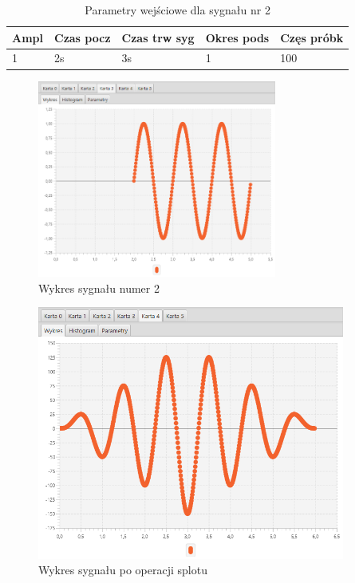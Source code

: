 \documentclass[12pt]{article}
\begin{document}
{{{                \begin{table}[H]
                    \centering
                    \begin{tabular}{|l|l|l|l|l|}
                        \hline
                        Ampl & Czas pocz & Czas trw syg & Okres pods & Częs próbk   \\ \hline
                        1 & 2s & 3s & 1 & 100           \\ \hline
                    \end{tabular}
                    \caption{Parametry wejściowe dla sygnału nr 2}
                \end{table}
                \begin{figure}[H]
                    \centering
                    \includegraphics[width=0.7\textwidth]{img/result/convolution/experiment1/data_105856.png}
                    \caption{Wykres sygnału numer 2}
                \end{figure}

                \begin{figure}[H]
                    \centering
                    \includegraphics[width=0.9\textwidth]{img/result/convolution/experiment1/data_105901.png}
                    \caption{Wykres sygnału po operacji splotu}
                \end{figure}
            }
            \newpage

}}
\end{document}

